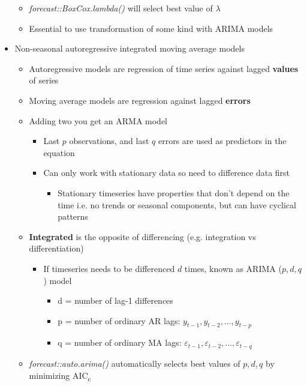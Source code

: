 \documentclass{article}\usepackage[]{graphicx}\usepackage[]{color}
\begin{document}
\begin{itemize}
    \begin{itemize}
        \item \textit{forecast::BoxCox.lambda()} will select best value of $\lambda$
        \item Essential to use transformation of some kind with ARIMA models
    \end{itemize}
    \item Non-seasonal autoregressive integrated moving average models
    \begin{itemize}
        \item Autoregressive models are regression of time series against lagged \textbf{values} of series
        \item Moving average models are regression against lagged \textbf{errors}
        \item Adding two you get an ARMA model
        \begin{itemize}
            \item Last $p$ observations, and last $q$ errors are used as predictors in the equation
            \item Can only work with stationary data so need to difference data first
            \begin{itemize}
                \item Stationary timeseries have properties that don't depend on the time i.e. no trends or seasonal components, but can have cyclical patterns
            \end{itemize}
        \end{itemize}
        \item \textbf{Integrated} is the opposite of differencing (e.g. integration vs differentiation)
        \begin{itemize}
            \item If timeseries needs to be differenced $d$ times, known as ARIMA ($p, d, q$) model
            \begin{itemize}
                \item d = number of lag-1 differences
                \item p = number of ordinary AR lags: $y_{t-1}, y_{t-2}, \ldots, y_{t-p}$
                \item q = number of ordinary MA lags: $\varepsilon_{t-1}, \varepsilon_{t-2}, \ldots, \varepsilon_{t-q}$
            \end{itemize}
        \end{itemize}
        \item \textit{forecast::auto.arima()} automatically selects best values of $p, d, q$ by minimizing AIC\textsubscript{c}

\end{itemize}
\end{itemize}
\end{document}
